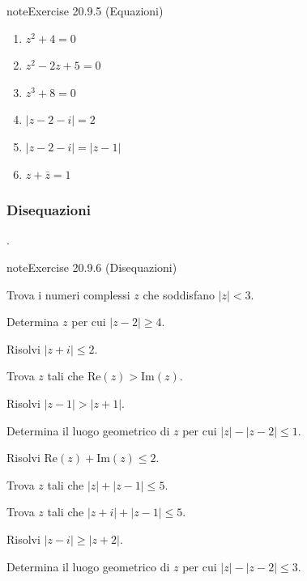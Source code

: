 \documentclass[letterpaper,10pt,italian]{jupyterBook}
\begin{document}
\begin{sphinxadmonition}{note}{Exercise 20.9.5 (Equazioni)}
\begin{enumerate}
\item {} 
\sphinxAtStartPar
\(z^2 + 4 = 0\)

\item {} 
\sphinxAtStartPar
\(z^2 - 2z + 5 = 0\)

\item {} 
\sphinxAtStartPar
\(z^3 + 8 = 0\)

\item {} 
\sphinxAtStartPar
\(|z-2-i| = 2\)

\item {} 
\sphinxAtStartPar
\(|z-2-i| = |z-1|\)

\item {} 
\sphinxAtStartPar
\(z + \bar{z} = 1\)

\end{enumerate}


\end{sphinxadmonition}


\subsubsection{Disequazioni}
\label{\detokenize{ch/algebra/complex-algebra-problems:disequazioni}}\label{\detokenize{ch/algebra/complex-algebra-problems:math-hs-algebra-complex-problems-equations-ineq}}
\sphinxAtStartPar
{\hyperref[\detokenize{ch/algebra/complex-algebra-sol:math-hs-algebra-complex-sol-equations-ineq-sol}]{}}.
 \label{exercise:ch/algebra/complex-algebra-problems-exercise-5}

\begin{sphinxadmonition}{note}{Exercise 20.9.6 (Disequazioni)}



\sphinxAtStartPar
{} Trova i numeri complessi \(z\) che soddisfano \(|z| < 3\).

\sphinxAtStartPar
{} Determina \(z\) per cui \(|z - 2| \geq 4\).

\sphinxAtStartPar
{} Risolvi \(|z + i| \leq 2\).

\sphinxAtStartPar
{} Trova \(z\) tali che \(\text{Re}(z) > \text{Im}(z)\).

\sphinxAtStartPar
{} Risolvi \(|z - 1| > |z + 1|\).

\sphinxAtStartPar
{} Determina il luogo geometrico di \(z\) per cui \(|z| - |z-2| \leq 1\).

\sphinxAtStartPar
{} Risolvi \(\text{Re}(z) + \text{Im}(z) \leq 2\).

\sphinxAtStartPar
{} Trova \(z\) tali che \(|z| + |z - 1| \leq 5\).

\sphinxAtStartPar
{} Trova \(z\) tali che \(|z+i| + |z - 1| \leq 5\).

\sphinxAtStartPar
{} Risolvi \(|z - i| \geq |z + 2|\).

\sphinxAtStartPar
{} Determina il luogo geometrico di \(z\) per cui \(|z| - |z-2| \leq 3\).
\end{sphinxadmonition}
\end{document}
